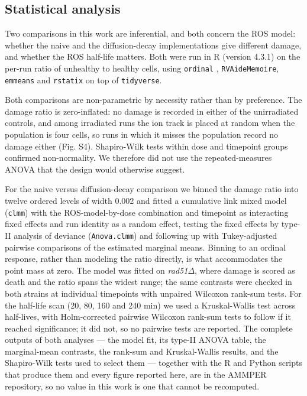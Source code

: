 \documentclass{asmarticle}
\begin{document}
\subsection{Statistical analysis}
Two comparisons in this work are inferential, and both concern the ROS model: whether the naive and the diffusion-decay implementations give different damage, and whether the ROS half-life matters. Both were run in R (version 4.3.1) on the per-run ratio of unhealthy to healthy cells, using \texttt{ordinal} \cite{christensen2019ordinal}, \texttt{RVAideMemoire}, \texttt{emmeans} and \texttt{rstatix} on top of \texttt{tidyverse}.

Both comparisons are non-parametric by necessity rather than by preference. The damage ratio is zero-inflated: no damage is recorded in either of the unirradiated controls, and among irradiated runs the ion track is placed at random when the population is four cells, so runs in which it misses the population record no damage either (Fig. S4). Shapiro-Wilk tests within dose and timepoint groups confirmed non-normality. We therefore did not use the repeated-measures ANOVA that the design would otherwise suggest.

For the naive versus diffusion-decay comparison we binned the damage ratio into twelve ordered levels of width 0.002 and fitted a cumulative link mixed model (\texttt{clmm}) with the ROS-model-by-dose combination and timepoint as interacting fixed effects and run identity as a random effect, testing the fixed effects by type-II analysis of deviance (\texttt{Anova.clmm}) and following up with Tukey-adjusted pairwise comparisons of the estimated marginal means. Binning to an ordinal response, rather than modeling the ratio directly, is what accommodates the point mass at zero. The model was fitted on \textit{rad51}$\Delta$, where damage is scored as death and the ratio spans the widest range; the same contrasts were checked in both strains at individual timepoints with unpaired Wilcoxon rank-sum tests. For the half-life scan (20, 80, 160 and 240 min) we used a Kruskal-Wallis test across half-lives, with Holm-corrected pairwise Wilcoxon rank-sum tests to follow if it reached significance; it did not, so no pairwise tests are reported. The complete outputs of both analyses --- the model fit, its type-II ANOVA table, the marginal-mean contrasts, the rank-sum and Kruskal-Wallis results, and the Shapiro-Wilk tests used to select them --- together with the R and Python scripts that produce them and every figure reported here, are in the AMMPER repository, so no value in this work is one that cannot be recomputed.
\end{document}
